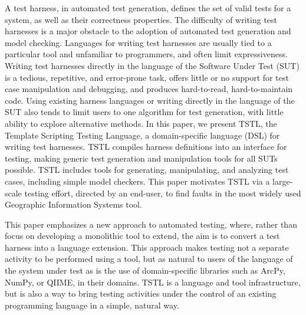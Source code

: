 A test harness, in automated test generation, defines the set of valid
tests for a system, as well as their correctness properties. The
difficulty of writing test harnesses is a major obstacle to the
adoption of automated test generation and model checking. Languages
for writing test harnesses are usually tied to a particular tool and
unfamiliar to programmers, and often limit expressiveness. Writing
test harnesses directly in the language of the Software Under Test
(SUT) is a tedious, repetitive, and error-prone task, offers little or
no support for test case manipulation and debugging, and produces
hard-to-read, hard-to-maintain code. Using existing harness languages
or writing directly in the language of the SUT also tends to limit
users to one algorithm for test generation, with little ability to
explore alternative methods. In this paper, we present TSTL, the
Template Scripting Testing Language, a domain-specific language (DSL)
for writing test harnesses. TSTL compiles harness definitions into an
interface for testing, making generic test generation and manipulation
tools for all SUTs possible. TSTL includes tools for generating,
manipulating, and analyzing test cases, including simple model
checkers. This paper motivates TSTL via a large-scale testing effort,
directed by an end-user, to find faults in the most widely used
Geographic Information Systems tool.

This paper emphasizes a new approach to automated testing, where,
rather than focus on developing a monolithic tool to extend, the aim
is to convert a test harness into a language extension. This approach
makes testing not a separate activity to be performed using a tool,
but as natural to users of the language of the system under test as is
the use of domain-specific libraries such as ArcPy, NumPy, or QIIME,
in their domains. TSTL is a language and tool infrastructure, but is
also a way to bring testing activities under the control of an
existing programming language in a simple, natural way.